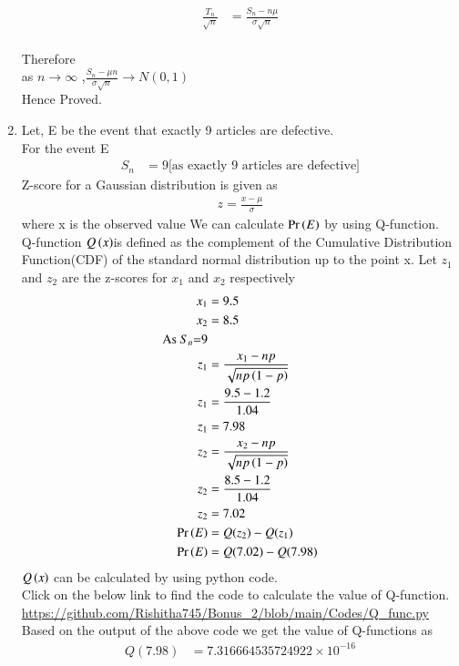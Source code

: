 \documentclass[journal,12pt,twocolumn]{IEEEtran}
\begin{document}
\begin{enumerate}[label=(\Roman*), align=left]
\begin{align}
    \frac{T_n}{\sqrt{n}}&= \frac{S_n-n\mu}{\sigma{\sqrt{n}}}
    \end{align}
\\Therefore
\\ as $n \to \infty$ ,$\frac{S_n -\mu{n}}{\sigma{\sqrt{n}}} \to N(0,1)$
\\Hence Proved.
\item
 Let, E be the event that exactly 9 articles are defective.
 \\For the event E
 \begin{align}
    S_n &= 9 \text{[as exactly 9 articles are defective]}\nonumber
    \end{align}
Z-score for a Gaussian distribution is given as
 \begin{align}
    z=\frac{x-\mu}{\sigma}
    \end{align}
where x is the observed value
We can calculate $\Pr\left(E\right)$ by using Q-function.
\\Q-function $Q\left(x\right)$is defined as the complement of the Cumulative Distribution Function(CDF) of the standard normal distribution up to the point x.
Let $z_1$ and $z_2$ are the z-scores for $x_1$ and $x_2$ respectively
 \begin{align}
    x_1 &=9.5\nonumber\\
    x_2 &=8.5\nonumber\\
    \text{As $S_n$=9}\nonumber\\
    z_1 &=\frac{x_1-np}{\sqrt{np\left(1-p\right)}}\nonumber\\
    z_1 &= \frac{9.5-1.2}{1.04}\nonumber\\
    z_1 &= 7.98\\
    z_2 &=\frac{x_2-np}{\sqrt{np\left(1-p\right)}}\nonumber\\
    z_2 &= \frac{8.5-1.2}{1.04}\nonumber\\
    z_2 &= 7.02\\
    \Pr\left(E\right) &=Q(z_2)-Q(z_1)\\
    \Pr\left(E\right) &=Q(7.02)-Q(7.98)
    \end{align}
$Q\left(x\right)$ can be calculated by using python code.
\\Click on the below link to find the code to calculate the value of Q-function.
\\\url{https://github.com/Rishitha745/Bonus_2/blob/main/Codes/Q_func.py}
\\Based on the output of the above code we get the value of Q-functions as
\begin{align}
    Q(7.98)&=7.316664535724922\times 10^{-16}\\

\end{align}
\end{enumerate}
\end{document}
